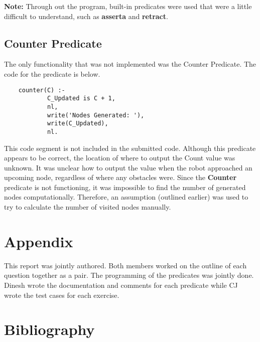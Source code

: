 \documentclass[11pt]{article}
\newcommand{\forceindent}{\leavevmode{\parindent=1em\indent}}
\begin{document}
\textbf{Note:} Through out the program, built-in predicates were used that were a little difficult to understand, such as \textbf{asserta} and \textbf{retract}.
\subsection{Counter Predicate}
\forceindent The only functionality that was not implemented was the Counter Predicate. The code for the predicate is below.
\begin{lstlisting} 
	counter(C) :-
			C_Updated is C + 1,
			nl,
			write('Nodes Generated: '),
			write(C_Updated), 
			nl.				
\end{lstlisting}
\vspace{2 mm} 
\forceindent This code segment is not included in the submitted code. Although this predicate appears to be correct, the location of where to output the Count value was unknown. It was unclear how to output the value when the robot approached an upcoming node, regardless of where any obstacles were. Since the \textbf{Counter} predicate is not functioning, it was impossible to find the number of generated nodes computationally. Therefore, an assumption (outlined earlier) was used to try to calculate the number of visited nodes manually.   

\section{Appendix}
\forceindent This report was jointly authored. Both members worked on the outline of each question together as a pair. The programming of the predicates was jointly done. Dinesh wrote the documentation and comments for each predicate while CJ wrote the test cases for each exercise.

\section{Bibliography}
\nocite{*}
\doublespacing
\renewcommand{\section}[2]{}%
\printbibliography
\end{document}
